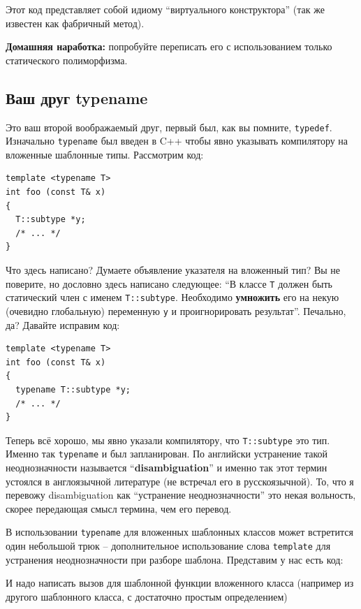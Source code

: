 \documentclass[a4paper,12pt,oneside]{article}
\begin{document}
Этот код представляет собой идиому ``виртуального конструктора'' (так же известен как фабричный метод).

\textbf{Домашняя наработка:} попробуйте переписать его с использованием только статического полиморфизма.

\subsection{Ваш друг typename}

Это ваш второй воображаемый друг, первый был, как вы помните, \lstinline!typedef!. Изначально \lstinline!typename! был введен в C++ чтобы явно указывать компилятору на вложенные шаблонные типы. Рассмотрим код:

\begin{lstlisting}
template <typename T>
int foo (const T& x)
{
  T::subtype *y;
  /* ... */
}
\end{lstlisting}

Что здесь написано? Думаете объявление указателя на вложенный тип? Вы не поверите, но дословно здесь написано 
следующее: ``В классе \lstinline!T! должен быть статический член с именем \lstinline!T::subtype!. Необходимо \textbf{умножить} его на некую (очевидно глобальную) переменную \lstinline!y! и проигнорировать результат''. Печально, да? Давайте исправим код:

\begin{lstlisting}
template <typename T>
int foo (const T& x)
{
  typename T::subtype *y;
  /* ... */
}
\end{lstlisting}

Теперь всё хорошо, мы явно указали компилятору, что \lstinline!T::subtype! это тип. Именно так \lstinline!typename! и был запланирован. По английски устранение такой неоднозначности называется ``\textbf{disambiguation}''  и именно так этот термин устоялся в англоязычной литературе (не встречал его в русскоязычной). То, что я перевожу disambiguation как ``устранение неоднозначности'' это некая вольность, скорее передающая смысл термина, чем его перевод.

В использовании \lstinline!typename! для вложенных шаблонных классов может встретится один небольшой трюк -- дополнительное использование слова \lstinline!template! для устранения неоднозначности при разборе шаблона. Представим у нас есть код:



И надо написать вызов для шаблонной функции вложенного класса (например из другого шаблонного класса, с достаточно простым определением)
\end{document}
